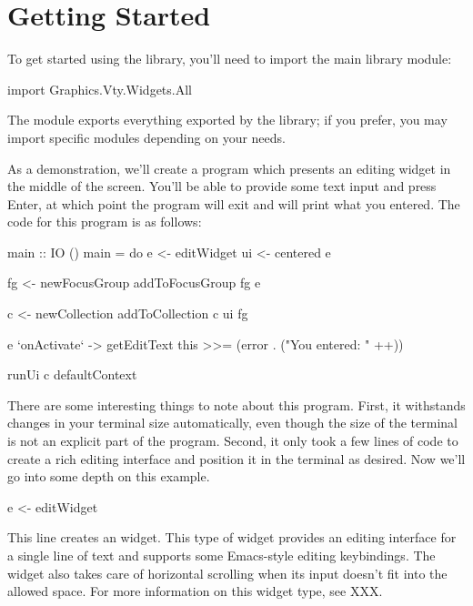 \section{Getting Started}
\label{sec:gettingStarted}

To get started using the library, you'll need to import the main library
module:

\begin{haskellcode}
 import Graphics.Vty.Widgets.All
\end{haskellcode}

The  module exports everything exported by the library; if you
prefer, you may import specific modules depending on your needs.

As a demonstration, we'll create a program which presents an editing
widget in the middle of the screen.  You'll be able to provide some
text input and press Enter, at which point the program will exit and
will print what you entered.  The code for this program is as follows:

\begin{haskellcode}
 main :: IO ()
 main = do
   e <- editWidget
   ui <- centered e

   fg <- newFocusGroup
   addToFocusGroup fg e

   c <- newCollection
   addToCollection c ui fg

   e `onActivate` \this ->
     getEditText this >>= (error . ("You entered: " ++))

   runUi c defaultContext
\end{haskellcode}

There are some interesting things to note about this program.  First,
it withstands changes in your terminal size automatically, even though
the size of the terminal is not an explicit part of the program.
Second, it only took a few lines of code to create a rich editing
interface and position it in the terminal as desired.  Now we'll go
into some depth on this example.

\begin{haskellcode}
 e <- editWidget
\end{haskellcode}

This line creates an  widget.  This type of widget provides
an editing interface for a single line of text and supports some
Emacs-style editing keybindings.  The  widget also takes care
of horizontal scrolling when its input doesn't fit into the allowed
space.  For more information on this widget type, see XXX.

